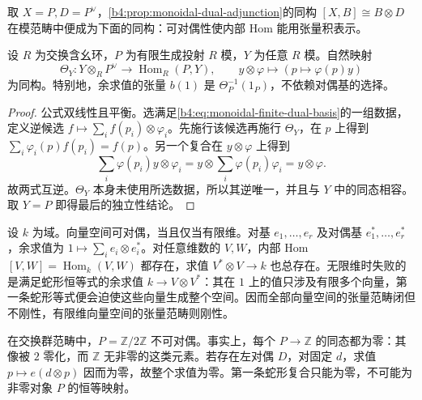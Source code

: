 取 \(X=P,D=P^\vee\)，\cref{b4:prop:monoidal-dual-adjunction}的同构 \([X,B]\cong B\otimes D\) 在模范畴中便成为下面的同构：可对偶性使内部 Hom 能用张量积表示。

\begin{proposition}\label{b4:prop:projective-dual-internal-hom}
	设 \(R\) 为交换含幺环，\(P\) 为有限生成投射 \(R\) 模，\(Y\) 为任意 \(R\) 模。自然映射
	\[
		\Theta_Y:Y\otimes_RP^\vee\longrightarrow\operatorname{Hom}_R(P,Y), \qquad y\otimes\varphi\longmapsto(p\longmapsto\varphi(p)y)
	\]
	为同构。特别地，余求值的张量 \(b(1)\) 是 \(\Theta_P^{-1}(1_P)\)，不依赖对偶基的选择。
\end{proposition}
\begin{proof}
	公式双线性且平衡。选满足\eqref{b4:eq:monoidal-finite-dual-basis}的一组数据，定义逆候选 \(f\mapsto\sum_i f(p_i)\otimes\varphi_i\)。先施行该候选再施行 \(\Theta_Y\)，在 \(p\) 上得到 \(\sum_i\varphi_i(p)f(p_i)=f(p)\)。另一个复合在 \(y\otimes\varphi\) 上得到
	\[
		\sum_i\varphi(p_i)y\otimes\varphi_i =y\otimes\sum_i\varphi(p_i)\varphi_i=y\otimes\varphi.
	\]
	故两式互逆。\(\Theta_Y\) 本身未使用所选数据，所以其逆唯一，并且与 \(Y\) 中的同态相容。取 \(Y=P\) 即得最后的独立性结论。
\end{proof}

\begin{example}\label{b4:exm:dualizable-vector-spaces}
	设 \(k\) 为域。向量空间可对偶，当且仅当有限维。对基 \(e_1,\ldots,e_r\) 及对偶基 \(e_1^*,\ldots,e_r^*\)，余求值为 \(1\mapsto\sum_i e_i\otimes e_i^*\)。对任意维数的 \(V,W\)，内部 Hom \([V,W]=\operatorname{Hom}_k(V,W)\) 都存在，求值 \(V^*\otimes V\to k\) 也总存在。无限维时失败的是满足蛇形恒等式的余求值 \(k\to V\otimes V^*\)：其在 \(1\) 上的值只涉及有限多个向量，第一条蛇形等式便会迫使这些向量生成整个空间。因而全部向量空间的张量范畴闭但不刚性，有限维向量空间的张量范畴则刚性。
\end{example}

\begin{example}\label{b4:exm:torsion-no-dual}
	在交换群范畴中，\(P=\mathbb Z/2\mathbb Z\) 不可对偶。事实上，每个 \(P\to\mathbb Z\) 的同态都为零：其像被 \(2\) 零化，而 \(\mathbb Z\) 无非零的这类元素。若存在左对偶 \(D\)，对固定 \(d\)，求值 \(p\mapsto e(d\otimes p)\) 因而为零，故整个求值为零。第一条蛇形复合只能为零，不可能为非零对象 \(P\) 的恒等映射。
\end{example}
